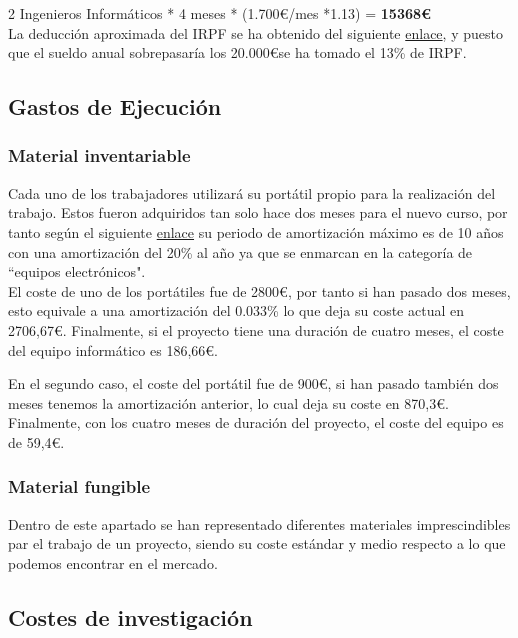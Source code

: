 \documentclass[a4paper,12pt,oneside]{article}
\begin{document}
2 Ingenieros Informáticos * 4 meses * (1.700\euro /mes *1.13) = \textbf{15368\euro} \\

La deducción aproximada del IRPF se ha obtenido del siguiente \href{https://infoautonomos.eleconomista.es/contratar-trabajadores/calcular-retenciones-IRPF-nominas/}{enlace}, y puesto que el sueldo anual sobrepasaría los 20.000\euro se ha tomado el 13\% de IRPF.

\subsection*{Gastos de Ejecución}

\subsubsection*{Material inventariable}

Cada uno de los trabajadores utilizará su portátil propio para la realización del trabajo. Estos fueron adquiridos tan solo hace dos meses para el nuevo curso, por tanto según el siguiente \href{https://cuentica.com/asesoria/tabla-anos-y-porcentajes-de-amortizacion-sociedades-a-partir-de-2015/}{enlace} su periodo de amortización máximo es de 10 años con una amortización del 20\% al año ya que se enmarcan en la categoría de ``equipos electrónicos". \\

El coste de uno de los portátiles fue de  2800\euro, por tanto si han pasado dos meses, esto equivale a una amortización del 0.033\% lo que deja su coste actual en 2706,67\euro. Finalmente, si el proyecto tiene una duración de cuatro meses, el coste del equipo informático es 186,66\euro.

En el segundo caso, el coste del portátil fue de 900\euro, si han pasado también dos meses tenemos la amortización anterior, lo cual deja su coste en 870,3\euro. Finalmente, con los cuatro meses de duración del proyecto, el coste del equipo es de 59,4\euro.

\subsubsection*{Material fungible}

Dentro de este apartado se han representado diferentes materiales imprescindibles par el trabajo de un proyecto, siendo su coste estándar y medio respecto a lo que podemos encontrar en el mercado.

\subsection*{Costes de investigación}
\end{document}

